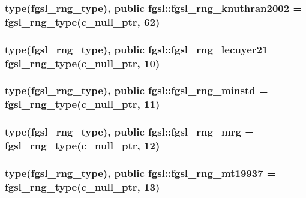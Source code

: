 \hypertarget{classfgsl_a4148e5146be887be4fac343f69ce9399}{
\subsubsection[{fgsl\-\_\-rng\-\_\-knuthran2002}]{\setlength{\rightskip}{0pt plus 5cm}type({\bf fgsl\-\_\-rng\-\_\-type}), public fgsl\-::fgsl\-\_\-rng\-\_\-knuthran2002 = {\bf fgsl\-\_\-rng\-\_\-type}(c\-\_\-null\-\_\-ptr, 62)}}\label{classfgsl_a4148e5146be887be4fac343f69ce9399}
\hypertarget{classfgsl_a636f91cce473d59c5b32c77a329f4486}{
\subsubsection[{fgsl\-\_\-rng\-\_\-lecuyer21}]{\setlength{\rightskip}{0pt plus 5cm}type({\bf fgsl\-\_\-rng\-\_\-type}), public fgsl\-::fgsl\-\_\-rng\-\_\-lecuyer21 = {\bf fgsl\-\_\-rng\-\_\-type}(c\-\_\-null\-\_\-ptr, 10)}}\label{classfgsl_a636f91cce473d59c5b32c77a329f4486}
\hypertarget{classfgsl_a9bc7cd5586595c2ac502e3f6496869a9}{
\subsubsection[{fgsl\-\_\-rng\-\_\-minstd}]{\setlength{\rightskip}{0pt plus 5cm}type({\bf fgsl\-\_\-rng\-\_\-type}), public fgsl\-::fgsl\-\_\-rng\-\_\-minstd = {\bf fgsl\-\_\-rng\-\_\-type}(c\-\_\-null\-\_\-ptr, 11)}}\label{classfgsl_a9bc7cd5586595c2ac502e3f6496869a9}
\hypertarget{classfgsl_a598ecc30ecba7ed571bf0d76f66cc23f}{
\subsubsection[{fgsl\-\_\-rng\-\_\-mrg}]{\setlength{\rightskip}{0pt plus 5cm}type({\bf fgsl\-\_\-rng\-\_\-type}), public fgsl\-::fgsl\-\_\-rng\-\_\-mrg = {\bf fgsl\-\_\-rng\-\_\-type}(c\-\_\-null\-\_\-ptr, 12)}}\label{classfgsl_a598ecc30ecba7ed571bf0d76f66cc23f}
\hypertarget{classfgsl_ac85f5a9aab93968683416a0bf672122d}{
\subsubsection[{fgsl\-\_\-rng\-\_\-mt19937}]{\setlength{\rightskip}{0pt plus 5cm}type({\bf fgsl\-\_\-rng\-\_\-type}), public fgsl\-::fgsl\-\_\-rng\-\_\-mt19937 = {\bf fgsl\-\_\-rng\-\_\-type}(c\-\_\-null\-\_\-ptr, 13)}}\label{classfgsl_ac85f5a9aab93968683416a0bf672122d}
